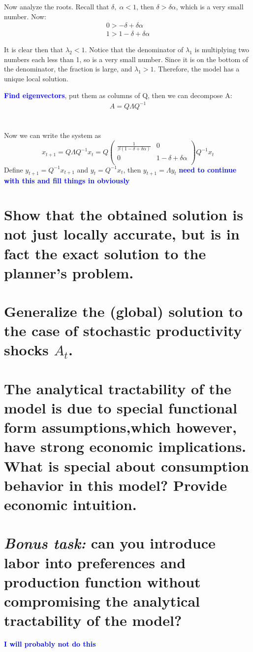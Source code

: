 \documentclass[12pt,oneside,reqno]{amsart}
\newcommand{\fix} [1] {\textbf{\textcolor{blue}{#1}}} %
\begin{document}
Now analyze the roots. Recall that $\delta,\;\alpha <1$, then $\delta > \delta\alpha$, which is a very small number. Now:
\begin{align*}
0 > -\delta +\delta\alpha 
\\
1 > 1-\delta +\delta\alpha
\end{align*}

It is clear then that $\lambda_2<1$. Notice that the denominator of $\lambda_1$ is multiplying two numbers each less than 1, so is a very small number. Since it is on the bottom of the denominator, the fraction is large, and $\lambda_1>1$. Therefore, the model has a unique local solution. 

\fix{Find eigenvectors}, put them as columns of Q, then we can decompose A:
\begin{align*}
A = Q \Lambda Q^{-1} 
\end{align*}
\\\\
Now we can write the system as 
\[x_{t+1} = Q\Lambda Q^{-1} x_t
    = Q \begin{pmatrix}
    \frac{1}{\beta(1-\delta+\delta\alpha)} & 0 \\
    0 & 1-\delta+\delta\alpha  \\
    \end{pmatrix} Q^{-1} x_t 
\] 
Define $y_{t+1} = Q^{-1}x_{t+1}$ and $y_t = Q^{-1}x_t$, then $y_{t+1} = \Lambda y_t$
\fix{need to continue with this and fill things in obviously} 

\section{Show that the obtained solution is not just locally accurate, but is in fact the exact solution to the planner’s problem.}


\section{Generalize the (global) solution to the case of stochastic productivity shocks $A_t$.}


\section{The analytical tractability of the model is due to special functional form assumptions,which however, have strong economic implications. What is special about consumption behavior in this model? Provide economic intuition.}


\section{\textit{Bonus task:} can you introduce labor into preferences and production function without compromising the analytical tractability of the model?}
\fix{I will probably not do this} 
\end{document}
